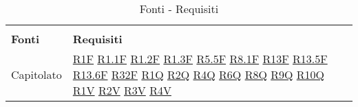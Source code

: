 
\begin{center}
    \centering
    \renewcommand{\arraystretch}{1.8}
    \label{tab:FontiRequisiti}
    \begin{longtable}[!h]{m{50px} m{50px}}
        \rowcolor{white}\caption{Fonti - Requisiti}                                     \\
        \rowcolor{logo!70} \textbf{Fonti} & \textbf{Requisiti}                          \\
        Capitolato                        & \hyperref[tab:RequisitiFunzionali]{R1F}
        \newline \hyperref[tab:RequisitiFunzionali]{R1.1F}
        \newline \hyperref[tab:RequisitiFunzionali]{R1.2F}
        \newline \hyperref[tab:RequisitiFunzionali]{R1.3F}
        \newline \hyperref[tab:RequisitiFunzionali]{R5.5F}
        \newline \hyperref[tab:RequisitiFunzionali]{R8.1F}
        \newline \hyperref[tab:RequisitiFunzionali]{R13F}
        \newline \hyperref[tab:RequisitiFunzionali]{R13.5F}
        \newline \hyperref[tab:RequisitiFunzionali]{R13.6F}
        \newline \hyperref[tab:RequisitiFunzionali]{R32F}
        \newline \hyperref[tab:RequisitiQualita]{R1Q}
        \newline \hyperref[tab:RequisitiQualita]{R2Q}
        \newline \hyperref[tab:RequisitiQualita]{R4Q}
        \newline \hyperref[tab:RequisitiQualita]{R6Q}
        \newline \hyperref[tab:RequisitiQualita]{R8Q}
        \newline \hyperref[tab:RequisitiQualita]{R9Q}
        \newline \hyperref[tab:RequisitiQualita]{R10Q}
        \newline \hyperref[tab:RequisitiVincolo]{R1V}
        \newline \hyperref[tab:RequisitiVincolo]{R2V}
        \newline \hyperref[tab:RequisitiVincolo]{R3V}
        \newline \hyperref[tab:RequisitiVincolo]{R4V}

\end{longtable}
\end{center}
